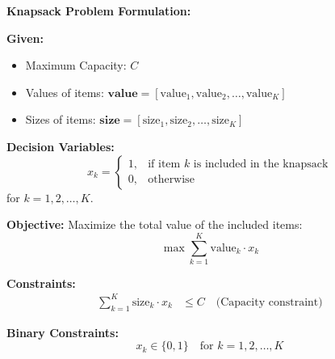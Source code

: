 \documentclass{article}
\begin{document}
\textbf{Knapsack Problem Formulation:}

\textbf{Given:}
\begin{itemize}
    \item Maximum Capacity: \( C \)
    \item Values of items: \( \mathbf{value} = [\text{value}_1, \text{value}_2, \ldots, \text{value}_K] \)
    \item Sizes of items: \( \mathbf{size} = [\text{size}_1, \text{size}_2, \ldots, \text{size}_K] \)
\end{itemize}

\textbf{Decision Variables:}
\[
x_k =
\begin{cases} 
1, & \text{if item } k \text{ is included in the knapsack} \\
0, & \text{otherwise}
\end{cases}
\]
for \( k = 1, 2, \ldots, K \).

\textbf{Objective:}
Maximize the total value of the included items:
\[
\max \sum_{k=1}^{K} \text{value}_k \cdot x_k
\]

\textbf{Constraints:}
\begin{align}
\sum_{k=1}^{K} \text{size}_k \cdot x_k & \leq C \quad \text{(Capacity constraint)}
\end{align}

\textbf{Binary Constraints:}
\[
x_k \in \{0, 1\} \quad \text{for } k = 1, 2, \ldots, K
\]
\end{document}
